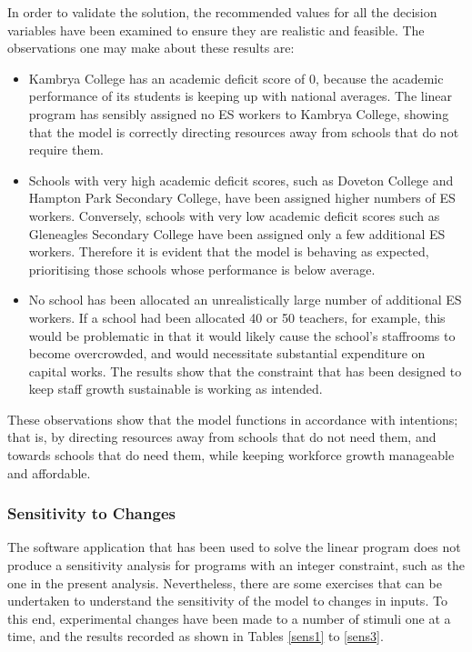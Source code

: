 \documentclass[11pt, a4paper]{article}
\begin{document}
    In order to validate the solution, the recommended values for all the decision variables have been examined to ensure they are realistic and feasible. The observations one may make about these results are:
    
    \begin{itemize}
        \item Kambrya College has an academic deficit score of 0, because the academic performance of its students is keeping up with national averages. The linear program has sensibly assigned no ES workers to Kambrya College, showing that the model is correctly directing resources away from schools that do not require them.
        \item Schools with very high academic deficit scores, such as Doveton College and Hampton Park Secondary College, have been assigned higher numbers of ES workers. Conversely, schools with very low academic deficit scores such as Gleneagles Secondary College have been assigned only a few additional ES workers. Therefore it is evident that the model is behaving as expected, prioritising those schools whose performance is below average.
        \item No school has been allocated an unrealistically large number of additional ES workers. If a school had been allocated 40 or 50 teachers, for example, this would be problematic in that it would likely cause the school's staffrooms to become overcrowded, and would necessitate substantial expenditure on capital works. The results show that the constraint that has been designed to keep staff growth sustainable is working as intended.
    \end{itemize}

    These observations show that the model functions in accordance with intentions; that is, by directing resources away from schools that do not need them, and towards schools that do need them, while keeping workforce growth manageable and affordable.

    \subsubsection{Sensitivity to Changes}    
    
    The software application that has been used to solve the linear program does not produce a sensitivity analysis for programs with an integer constraint, such as the one in the present analysis. Nevertheless, there are some exercises that can be undertaken to understand the sensitivity of the model to changes in inputs. To this end, experimental changes have been made to a number of stimuli one at a time, and the results recorded as shown in Tables \ref{sens1} to \ref{sens3}.
\end{document}

